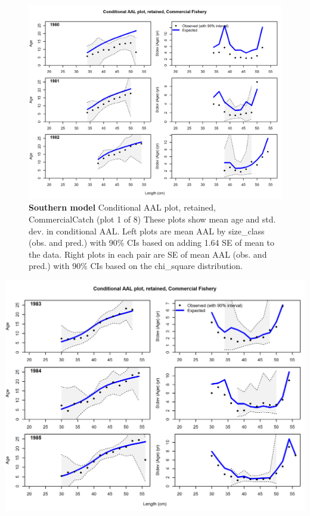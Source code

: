 \documentclass[12pt,]{article}
\begin{document}
\begin{figure}[htbp]
\centering
\includegraphics{./r4ss/plots_mod2/comp_condAALfit_Andre_plotsflt2mkt2_page1.png}
\caption{\textbf{Southern model} Conditional AAL plot, retained,
CommercialCatch (plot 1 of 8) These plots show mean age and std. dev. in
conditional AAL. Left plots are mean AAL by size\_class (obs. and pred.)
with 90\% CIs based on adding 1.64 SE of mean to the data. Right plots
in each pair are SE of mean AAL (obs. and pred.) with 90\% CIs based on
the chi\_square distribution.
\label{fig:mod2_5_comp_condAALfit_Andre_plotsflt2mkt2_page1}}
\end{figure}

\includegraphics{./r4ss/plots_mod2/comp_condAALfit_Andre_plotsflt2mkt2_page2.png}
\end{document}
